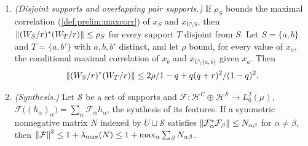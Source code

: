 \begin{lemma}
\begin{enumerate}[label=\textup{(\alph*)}]
  and $\norm{V_i^*V_j}\le r\sqrt{1+q}/(1-q)$ for $i\ne j$.
\item \emph{(Disjoint supports and overlapping pair supports.)} If $\rho_S$ bounds the maximal
  correlation (\cref{def:prelim:maxcorr}) of $x_S$ and $x_{U\setminus S}$, then
  $\left\|(W_S/r)^*(W_T/r)\right\|\le\rho_S$ for every support $T$ disjoint from $S$. Let
  $S=\{a,b\}$ and $T=\{a,b'\}$ with $a,b,b'$ distinct, and let $\rho$ bound, for every
  value of $x_a$, the conditional maximal correlation of $x_b$ and
  $x_{U\setminus\{a,b\}}$ given $x_a$. Then
  \begin{equation}\label{eq:pair-overlap}
    \left\|(W_S/r)^*(W_T/r)\right\|\le2\rho/1-q+q(q+r)^2/(1-q)^2 .
  \end{equation}
\item \emph{(Synthesis.)} Let $\mathcal S$ be a set of supports and
  $\mathcal F\colon\mathcal H^U\oplus\mathcal H^{\mathcal S}\to L^2_0(\mu)$,
  $\mathcal F\big((h_\alpha)_\alpha\big)=\sum_\alpha\mathcal F_\alpha h_\alpha$, the synthesis
  of its features. If a symmetric nonnegative matrix $N$ indexed by
  $U\sqcup\mathcal S$ satisfies $\left\|\mathcal F_\alpha^*\mathcal F_\beta\right\|\le N_{\alpha\beta}$
  for $\alpha\ne\beta$, then
  $\left\|\mathcal F\right\|^2\le1+\lambda_{\max}(N)\le1+\max_\alpha\sum_\beta N_{\alpha\beta}$.
\end{enumerate}
\end{lemma}

